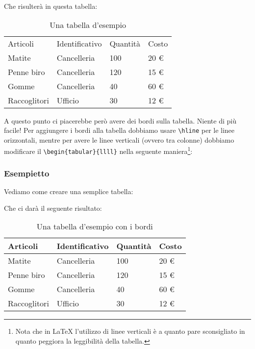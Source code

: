 Che risulterà in questa tabella:
\begin{table}[H]
\centering
\begin{tabular}{llll}
Articoli      & Identificativo & Quantità & Costo \\
Matite        & Cancelleria    & 100      & 20 \euro{}\\
Penne biro    & Cancelleria    & 120      & 15 \euro{}\\
Gomme         & Cancelleria    & 40       & 60 \euro{}\\
Raccoglitori  & Ufficio        & 30       & 12 \euro{}
\end{tabular}
\caption{Una tabella d'esempio}
\label{tabella:esempio}
\end{table}

A questo punto ci piacerebbe però avere dei bordi sulla tabella. Niente di più
facile! Per aggiungere i bordi alla tabella dobbiamo usare \verb!\hline! per le
linee orizzontali, mentre per avere le linee verticali (ovvero tra colonne)
dobbiamo modificare il \verb!\begin{tabular}{llll}! nella seguente
maniera\footnote{Nota che in \LaTeX{} l'utilizzo di linee verticali è a
quanto pare sconsigliato in quanto peggiora la leggibilità della tabella.}:

\vspace{\abovedisplayskip}
\begin{minipage}{\linewidth}
  \subsubsection{Esempietto}

  Vediamo come creare una semplice tabella:
  


\end{minipage}
\vspace{\belowdisplayskip}

Che ci darà il seguente risultato:

\begin{table}[H]
\centering
\begin{tabular}{|l|l|l|l|}
\hline
Articoli      & Identificativo & Quantità & Costo \\
\hline
Matite        & Cancelleria    & 100      & 20 \euro{}\\
\hline
Penne biro    & Cancelleria    & 120      & 15 \euro{}\\
\hline
Gomme         & Cancelleria    & 40       & 60 \euro{}\\
\hline
Raccoglitori  & Ufficio        & 30       & 12 \euro{}\\
\hline
\end{tabular}
\caption{Una tabella d'esempio con i bordi}
\label{tabella:esempio2}
\end{table}

